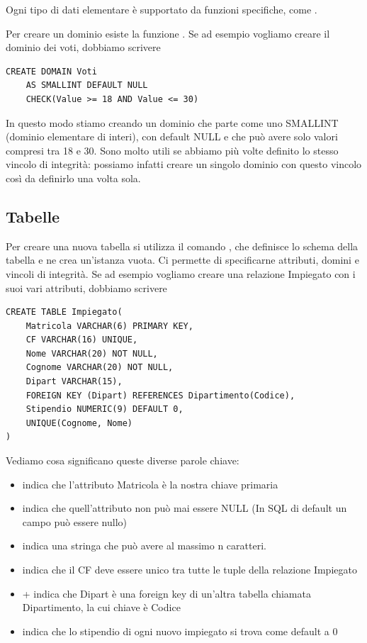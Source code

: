 \documentclass[11pt, a4paper, titlepage, oneside]{scrbook}
\begin{document}
Ogni tipo di dati elementare è supportato da funzioni specifiche, come .

Per creare un dominio esiste la funzione . Se ad esempio vogliamo creare il dominio dei voti, dobbiamo scrivere
\begin{lstlisting}
CREATE DOMAIN Voti
    AS SMALLINT DEFAULT NULL
    CHECK(Value >= 18 AND Value <= 30)
\end{lstlisting}
In questo modo stiamo creando un dominio che parte come uno SMALLINT (dominio elementare di interi), con default NULL e che può avere solo valori compresi tra 18 e 30. Sono molto utili se abbiamo più volte definito lo stesso vincolo di integrità: possiamo infatti creare un singolo dominio con questo vincolo così da definirlo una volta sola. 

\subsection*{Tabelle}

Per creare una nuova tabella si utilizza il comando , che definisce lo schema della tabella e ne crea un'istanza vuota. Ci permette di specificarne attributi, domini e vincoli di integrità. Se ad esempio vogliamo creare una relazione Impiegato con i suoi vari attributi, dobbiamo scrivere
\begin{lstlisting}
CREATE TABLE Impiegato(
    Matricola VARCHAR(6) PRIMARY KEY,
    CF VARCHAR(16) UNIQUE,
    Nome VARCHAR(20) NOT NULL,
    Cognome VARCHAR(20) NOT NULL,
    Dipart VARCHAR(15),
    FOREIGN KEY (Dipart) REFERENCES Dipartimento(Codice),
    Stipendio NUMERIC(9) DEFAULT 0,
    UNIQUE(Cognome, Nome)
)
\end{lstlisting}

Vediamo cosa significano queste diverse parole chiave:
\begin{itemize}
    \item {} indica che l'attributo Matricola è la nostra chiave primaria
    \item {} indica che quell'attributo non può mai essere NULL (\NB In SQL di default un campo può essere nullo)
    \item {} indica una stringa che può avere al massimo n caratteri.
    \item {} indica che il CF deve essere unico tra tutte le tuple della relazione Impiegato
    \item {} +  indica che Dipart è una foreign key di un'altra tabella chiamata Dipartimento, la cui chiave è Codice
    \item {} indica che lo stipendio di ogni nuovo impiegato si trova come default a 0
\end{itemize}
\end{document}

